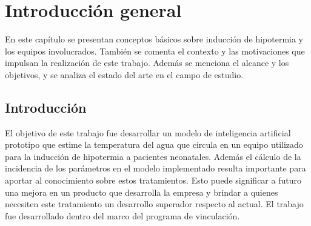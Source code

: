 
\chapter{Introducción general} %

En este capítulo se presentan conceptos básicos sobre inducción de hipotermia y los equipos involucrados. También se comenta el contexto y las motivaciones que impulsan la realización de este trabajo. Además se menciona el alcance y los objetivos, y se analiza el estado del arte en el campo de estudio.

\label{Chapter1} %
\label{IntroGeneral}


\newcommand{\keyword}[1]{\textbf{#1}}
\newcommand{\tabhead}[1]{\textbf{#1}}
\newcommand{\code}[1]{\texttt{#1}}
\newcommand{\file}[1]{\texttt{\bfseries#1}}
\newcommand{\option}[1]{\texttt{\itshape#1}}
\newcommand{\grados}{$^{\circ}$}



\section{Introducción}

El objetivo de este trabajo fue desarrollar un modelo de inteligencia artificial prototipo que estime la temperatura del agua que circula en un equipo utilizado para la inducción de hipotermia a pacientes neonatales. Además el cálculo de la incidencia de los parámetros en el modelo implementado resulta importante para aportar al conocimiento sobre estos tratamientos. Esto puede significar a futuro una mejora en un producto que desarrolla la empresa y brindar a quienes necesiten este tratamiento un desarrollo superador respecto al actual. El trabajo fue desarrollado dentro del marco del programa de vinculación. 

